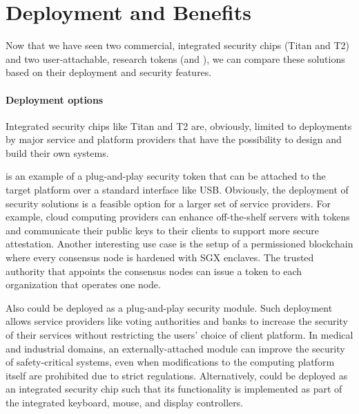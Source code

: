
\section*{Deployment and Benefits}

Now that we have seen two commercial, integrated security chips (Titan and T2) and two user-attachable, research tokens (\protection and \proximitee), we can compare these solutions based on their deployment and security features. 

\paragraph{Deployment options}
Integrated security chips like Titan and T2 are, obviously, limited to deployments by major service and platform providers that have the possibility to design and build their own systems. 

\proximitee is an example of a plug-and-play security token that can be attached to the target platform over a standard interface like USB. Obviously, the deployment of security solutions is a feasible option for a larger set of service providers. For example, cloud computing providers can enhance off-the-shelf servers with \key tokens and communicate their public keys to their clients to support more secure attestation. Another interesting use case is the setup of a permissioned blockchain where every consensus node is hardened with SGX enclaves. The trusted authority that appoints the consensus nodes can issue a \key token to each organization that operates one node.

Also \protection could be deployed as a plug-and-play security module. Such deployment allows service providers like voting authorities and banks to increase the security of their services without restricting the users' choice of client platform. In medical and industrial domains, an externally-attached \protection module can improve the security of safety-critical systems, even when modifications to the computing platform itself are prohibited due to strict regulations. Alternatively, \protection could be deployed as an integrated security chip such that its functionality is implemented as part of the integrated keyboard, mouse, and display controllers. 


